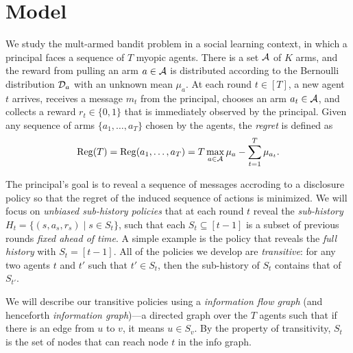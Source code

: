 \section{Model}
\label{sec:model}

We study the mult-armed bandit problem in a social learning context,
in which a principal faces a sequence of $T$ myopic agents. There is a
set $\mathcal{A}$ of $K$ arms, and the reward from pulling an arm $a\in \mathcal{A}$ is
distributed according to the Bernoulli distribution $\mathcal{D}_a$ with an
unknown mean $\mu_a$. At each round $t\in [T]$, a new agent $t$
arrives, receives a message $m_t$ from the principal, chooses an arm
$a_t\in \mathcal{A}$, and collects a reward $r_t\in \{0,1\}$ that is
immediately observed by the principal. Given any sequence of arms
$\{a_1, \ldots, a_T\}$ chosen by the agents, the \emph{regret} is
defined as
\[
  \mathrm{Reg}(T)= \mathrm{Reg}(a_1, \ldots , a_T) = T \max_{a\in \mathcal{A}} \mu_a -
  \sum_{t=1}^T \mu_{a_t}.
\]





 The principal's goal is to reveal
a sequence of messages accroding to a disclosure policy so that the
regret of the induced sequence of actions is minimized. We will focus
on \emph{unbiased sub-history policies} that at each round $t$ reveal
the \emph{sub-history} $H_t = \{(s, a_s, r_s)\mid s \in S_t\}$, such
that each $S_t\subseteq [t-1]$ is a subset of previous rounds
\emph{fixed ahead of time}. A simple example is the policy that
reveals the \emph{full history} with $S_t = [t-1]$.  All of the
policies we develop are \emph{transitive}: for any two agents $t$ and
$t'$ such that $t'\in S_t$, then the sub-history of $S_t$ contains
that of $S_{t'}$.


 We will describe our transitive
policies using a \emph{information flow graph} (and henceforth
\emph{information graph})---a directed graph over the $T$ agents such that if
there is an edge from $u$ to $v$, it means $u\in S_v$. By the property
of transitivity, $S_t$ is the set of nodes that can reach node $t$ in
the info graph.

\iffalse
\begin{itemize}
\item \textbf{Full history:} We show each agent the history of all previous agents' pulls. We call this policy \ALGG. 
\item \textbf{Unbiased sub-history:} We show each agent only a subset of history. The subsets are pre-determined before any arms are pulled.  
\item \textbf{Info graph:} All the recommendation policies in this paper can be described by an undirected transitive graph with $T$ nodes. We call it the info graph. The $T$ nodes in the graph represent the $T$ agents. If there is an edge between node $u$ and $v$ for $u < v$, it means the history of agent $u$ is shown to agent $v$.
\end{itemize}
\fi

